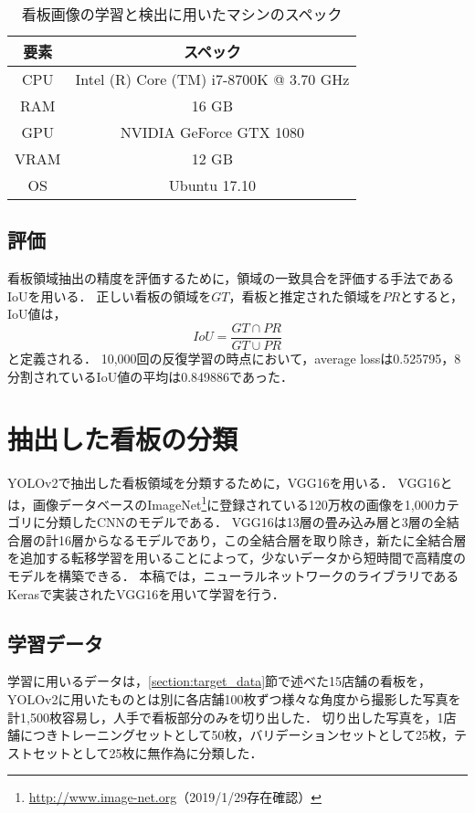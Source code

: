     \begin{table}[tb]
      \caption{看板画像の学習と検出に用いたマシンのスペック}
      \label{table:machine}
      \begin{center}
        \begin{tabular}{c|c}
          \hline
          要素 & スペック \\
          \hline
          CPU & Intel (R) Core (TM) i7-8700K @ 3.70 GHz \\
          RAM & 16 GB \\
          GPU & NVIDIA GeForce GTX 1080 \\
          VRAM & 12 GB \\
          OS & Ubuntu 17.10 \\
          \hline
        \end{tabular}
      \end{center}
    \end{table}

  \subsection{評価}
    看板領域抽出の精度を評価するために，領域の一致具合を評価する手法であるIoUを用いる．
    正しい看板の領域を$GT$，看板と推定された領域を$PR$とすると，IoU値は，
    \begin{equation}
      IoU = \frac{GT \cap PR}{GT \cup PR}
    \end{equation}
    と定義される．
    10,000回の反復学習の時点において，average lossは0.525795，8分割されているIoU値の平均は0.849886であった．


\section{抽出した看板の分類}
  YOLOv2で抽出した看板領域を分類するために，VGG16を用いる．
  VGG16とは，画像データベースのImageNet\footnote{\url{http://www.image-net.org}（2019/1/29存在確認）}に登録されている120万枚の画像を1,000カテゴリに分類したCNNのモデルである．
  VGG16は13層の畳み込み層と3層の全結合層の計16層からなるモデルであり，この全結合層を取り除き，新たに全結合層を追加する転移学習を用いることによって，少ないデータから短時間で高精度のモデルを構築できる．
  本稿では，ニューラルネットワークのライブラリであるKeras\cite{Chollet:2015}で実装されたVGG16を用いて学習を行う．

  \subsection{学習データ}
    学習に用いるデータは，\ref{section:target_data}節で述べた15店舗の看板を，YOLOv2に用いたものとは別に各店舗100枚ずつ様々な角度から撮影した写真を計1,500枚容易し，人手で看板部分のみを切り出した．
    切り出した写真を，1店舗につきトレーニングセットとして50枚，バリデーションセットとして25枚，テストセットとして25枚に無作為に分類した．
    
